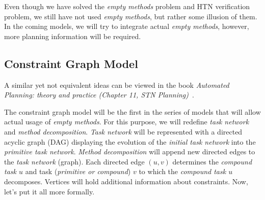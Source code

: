 \medskip\noindent
Even though we have solved the \emph{empty methods} problem and HTN verification problem, we still have not used \emph{empty methods}, but rather some illusion of them. In the coming models, we will try to integrate actual \emph{empty methods}, however, more planning information will be required.

\subsection{Constraint Graph Model}

\medskip\noindent
A similar yet not equivalent ideas can be viewed in the book \emph{Automated Planning: theory and practice (Chapter 11, STN Planning)}~\cite{nau}.

\medskip\noindent
The constraint graph model will be the first in the series of models that will allow actual usage of \emph{empty methods}. For this purpose, we will redefine \emph{task network} and \emph{method decomposition}. \emph{Task network} will be represented with a directed acyclic graph (DAG) displaying the evolution of the \emph{initial task network} into the \emph{primitive task network}. \emph{Method decomposition} will append new directed edges to the \emph{task network} (graph). Each directed edge $(u,v)$ determines the \emph{compound task $u$} and task (\emph{primitive or compound}) $v$ to which the \emph{compound task $u$} decomposes. Vertices will hold additional information about constraints. Now, let's put it all more formally.

